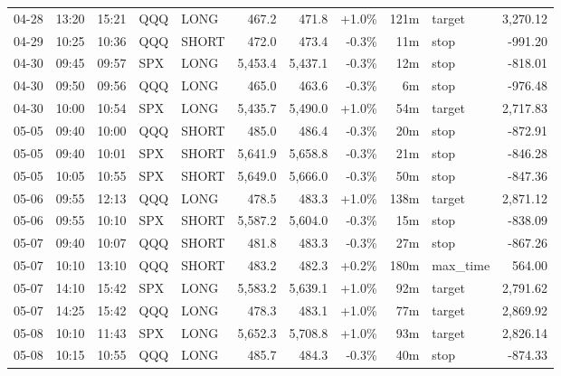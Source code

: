 \documentclass[11pt,a4paper,twoside]{article}
\begin{document}
\begin{center}
\begin{longtable}{>{\color{txtmain}}l l l l l r r r r >{\color{txtmain}}l r}
04-28 & 13:20 & 15:21 & QQQ & LONG & 467.2 & 471.8 & \textcolor{wingreen}{+1.0\%} & 121m & target & \textcolor{wingreen}{3,270.12} \\
04-29 & 10:25 & 10:36 & QQQ & SHORT & 472.0 & 473.4 & \textcolor{lossred}{-0.3\%} & 11m & stop & \textcolor{lossred}{-991.20} \\
04-30 & 09:45 & 09:57 & SPX & LONG & 5,453.4 & 5,437.1 & \textcolor{lossred}{-0.3\%} & 12m & stop & \textcolor{lossred}{-818.01} \\
04-30 & 09:50 & 09:56 & QQQ & LONG & 465.0 & 463.6 & \textcolor{lossred}{-0.3\%} & 6m & stop & \textcolor{lossred}{-976.48} \\
04-30 & 10:00 & 10:54 & SPX & LONG & 5,435.7 & 5,490.0 & \textcolor{wingreen}{+1.0\%} & 54m & target & \textcolor{wingreen}{2,717.83} \\
05-05 & 09:40 & 10:00 & QQQ & SHORT & 485.0 & 486.4 & \textcolor{lossred}{-0.3\%} & 20m & stop & \textcolor{lossred}{-872.91} \\
05-05 & 09:40 & 10:01 & SPX & SHORT & 5,641.9 & 5,658.8 & \textcolor{lossred}{-0.3\%} & 21m & stop & \textcolor{lossred}{-846.28} \\
05-05 & 10:05 & 10:55 & SPX & SHORT & 5,649.0 & 5,666.0 & \textcolor{lossred}{-0.3\%} & 50m & stop & \textcolor{lossred}{-847.36} \\
05-06 & 09:55 & 12:13 & QQQ & LONG & 478.5 & 483.3 & \textcolor{wingreen}{+1.0\%} & 138m & target & \textcolor{wingreen}{2,871.12} \\
05-06 & 09:55 & 10:10 & SPX & SHORT & 5,587.2 & 5,604.0 & \textcolor{lossred}{-0.3\%} & 15m & stop & \textcolor{lossred}{-838.09} \\
05-07 & 09:40 & 10:07 & QQQ & SHORT & 481.8 & 483.3 & \textcolor{lossred}{-0.3\%} & 27m & stop & \textcolor{lossred}{-867.26} \\
05-07 & 10:10 & 13:10 & QQQ & SHORT & 483.2 & 482.3 & \textcolor{wingreen}{+0.2\%} & 180m & max\_time & \textcolor{wingreen}{564.00} \\
05-07 & 14:10 & 15:42 & SPX & LONG & 5,583.2 & 5,639.1 & \textcolor{wingreen}{+1.0\%} & 92m & target & \textcolor{wingreen}{2,791.62} \\
05-07 & 14:25 & 15:42 & QQQ & LONG & 478.3 & 483.1 & \textcolor{wingreen}{+1.0\%} & 77m & target & \textcolor{wingreen}{2,869.92} \\
05-08 & 10:10 & 11:43 & SPX & LONG & 5,652.3 & 5,708.8 & \textcolor{wingreen}{+1.0\%} & 93m & target & \textcolor{wingreen}{2,826.14} \\
05-08 & 10:15 & 10:55 & QQQ & LONG & 485.7 & 484.3 & \textcolor{lossred}{-0.3\%} & 40m & stop & \textcolor{lossred}{-874.33} \\

\end{longtable}
\end{center}
\end{document}
